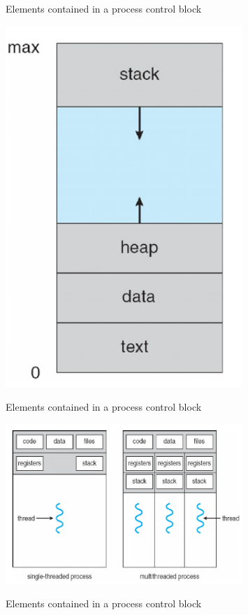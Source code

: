 \documentclass[10pt]{beamer}
\begin{document}
\begin{frame}[allowframebreaks]{}
\begin{figure}
         \caption{Elements contained in a process control block~\autocite{tanenbaum}}
        \end{figure}
        \framebreak
        \begin{figure}
         \includegraphics[keepaspectratio, width=0.8\textwidth, height=0.8\textheight-2\baselineskip-2\baselineskip]{img/010_process_memory.png} \\
         \caption{Elements contained in a process control block~\autocite{silberschatz}}
        \end{figure}
        \framebreak
        \begin{figure}
         \includegraphics[keepaspectratio, width=0.8\textwidth, height=0.8\textheight-2\baselineskip-2\baselineskip]{img/010_proc_threads.png} \\
         \caption{Elements contained in a process control block~\autocite{silberschatz}}
        \end{figure}
\end{frame}
\end{document}
